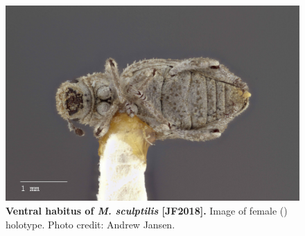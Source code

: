 \documentclass[fleqn,10pt,lineno]{wlpeerj} %
\begin{document}
\begin{figure}[h]
	\begin{sideways}
		\centering
		\includegraphics[height=\textwidth]{figure25.jpg}
	\end{sideways}
	\caption{\textbf{Ventral habitus of \textit{M. sculptilis} [JF2018].} Image of female (\female) holotype. Photo credit: Andrew Jansen.}
	\label{fig:sculptilis_F_ventral}
\end{figure}
\end{document}
